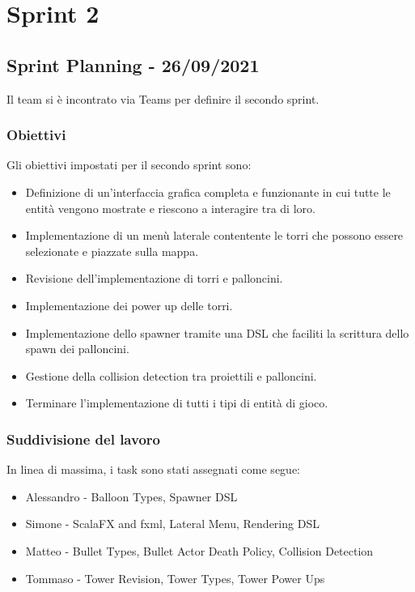 \section{Sprint 2}
\subsection{Sprint Planning - 26/09/2021}
Il team si è incontrato via Teams per definire il secondo sprint.

\subsubsection{Obiettivi}
Gli obiettivi impostati per il secondo sprint sono:
\begin{itemize}
    \item Definizione di un'interfaccia grafica completa e funzionante in cui tutte le entità vengono mostrate e riescono a interagire tra di loro.
    \item Implementazione di un menù laterale contentente le torri che possono essere selezionate e piazzate sulla mappa.
    \item Revisione dell'implementazione di torri e palloncini.
    \item Implementazione dei power up delle torri.
    \item Implementazione dello spawner tramite una DSL che faciliti la scrittura dello spawn dei palloncini.
    \item Gestione della collision detection tra proiettili e palloncini.
    \item Terminare l'implementazione di tutti i tipi di entità di gioco.
\end{itemize}

\subsubsection{Suddivisione del lavoro}
In linea di massima, i task sono stati assegnati come segue:
\begin{itemize}
    \item Alessandro - Balloon Types, Spawner DSL
    \item Simone - ScalaFX and fxml, Lateral Menu, Rendering DSL
    \item Matteo - Bullet Types, Bullet Actor Death Policy, Collision Detection
    \item Tommaso - Tower Revision, Tower Types, Tower Power Ups
\end{itemize}

